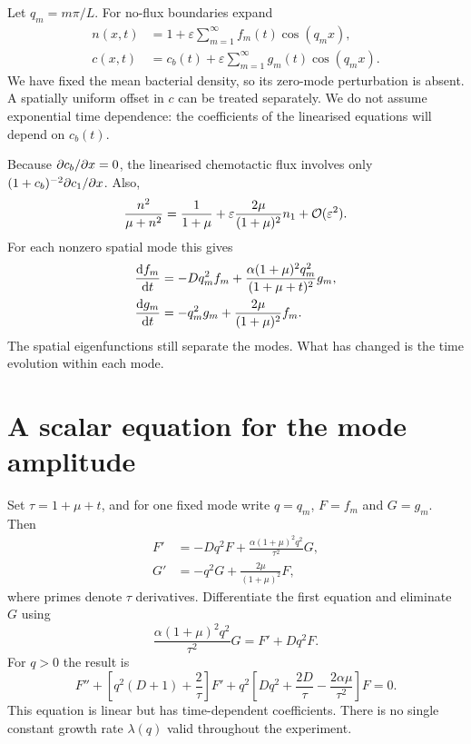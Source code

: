 \documentclass[main.tex]{subfiles}
\begin{document}
Let $q_m=m\pi/L$. For no-flux boundaries expand
\begin{align}\label{merged:dynamicexpansion}
n(x,t)&=1+\varepsilon\sum_{m=1}^{\infty}f_m(t)\cos(q_mx),\\
c(x,t)&=c_b(t)+\varepsilon\sum_{m=1}^{\infty}g_m(t)\cos(q_mx).
\end{align}
We have fixed the mean bacterial density, so its zero-mode perturbation is absent. A spatially uniform offset in $c$ can be treated separately. We do not assume exponential time dependence: the coefficients of the linearised equations will depend on $c_b(t)$.

Because $\pd{c_b}{x}=0$, the linearised chemotactic flux involves only
$(1+c_b)^{-2}\pd{c_1}{x}$. Also,
\begin{equation}
\frac{n^2}{\mu+n^2}=\frac{1}{1+\mu}
+\varepsilon\frac{2\mu}{(1+\mu)^2}n_1+\mathcal{O}(\varepsilon^2).
\end{equation}
For each nonzero spatial mode this gives
\begin{align}\label{feq}
\fd{f_m}{t}&=-Dq_m^2f_m+
\frac{\alpha(1+\mu)^2q_m^2}{(1+\mu+t)^2}g_m,\\
\fd{g_m}{t}&=-q_m^2g_m+
\frac{2\mu}{(1+\mu)^2}f_m.
\end{align}
The spatial eigenfunctions still separate the modes. What has changed is the time evolution within each mode.

\section{A scalar equation for the mode amplitude}
Set $\tau=1+\mu+t$, and for one fixed mode write $q=q_m$, $F=f_m$ and $G=g_m$. Then
\begin{align}\label{modeeq}
F'&=-Dq^2F+\frac{\alpha(1+\mu)^2q^2}{\tau^2}G,\\
G'&=-q^2G+\frac{2\mu}{(1+\mu)^2}F,
\end{align}
where primes denote $\tau$ derivatives. Differentiate the first equation and eliminate $G$ using
\begin{equation}
\frac{\alpha(1+\mu)^2q^2}{\tau^2}G=F'+Dq^2F.
\end{equation}
For $q>0$ the result is
\begin{equation}\label{ftaueq}
F''+\left[q^2(D+1)+\frac{2}{\tau}\right]F'
+q^2\left[Dq^2+\frac{2D}{\tau}-\frac{2\alpha\mu}{\tau^2}\right]F=0.
\end{equation}
This equation is linear but has time-dependent coefficients. There is no single constant growth rate $\lambda(q)$ valid throughout the experiment.
\end{document}
